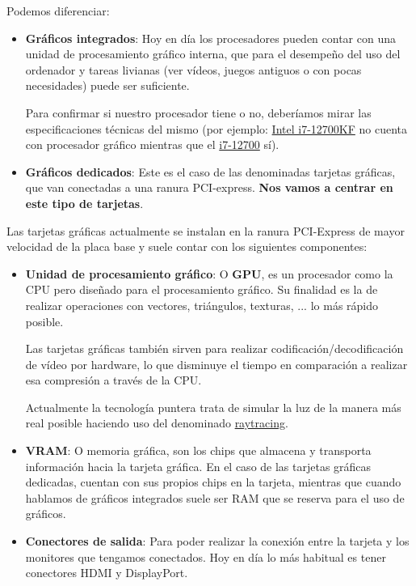 Podemos diferenciar:

\begin{itemize}
    \item \textbf{Gráficos integrados}: Hoy en día los procesadores pueden contar con una unidad de procesamiento gráfico interna, que para el desempeño del uso del ordenador y tareas livianas (ver vídeos, juegos antiguos o con pocas necesidades) puede ser suficiente.

    Para confirmar si nuestro procesador tiene o no, deberíamos mirar las especificaciones técnicas del mismo (por ejemplo: \href{https://www.intel.com/content/www/us/en/products/sku/134595/intel-core-i712700kf-processor-25m-cache-up-to-5-00-ghz/specifications.html}{Intel i7-12700KF} no cuenta con procesador gráfico mientras que el \href{https://www.intel.com/content/www/us/en/products/sku/134591/intel-core-i712700-processor-25m-cache-up-to-4-90-ghz/specifications.html}{i7-12700} sí).

    \item \textbf{Gráficos dedicados}: Este es el caso de las denominadas tarjetas gráficas, que van conectadas a una ranura PCI-express. \textbf{Nos vamos a centrar en este tipo de tarjetas}.
\end{itemize}

Las tarjetas gráficas actualmente se instalan en la ranura PCI-Express de mayor velocidad de la placa base y suele contar con los siguientes componentes:

\begin{itemize}
    \item \textbf{Unidad de procesamiento gráfico}: O \textbf{GPU}, es un procesador como la CPU pero diseñado para el procesamiento gráfico. Su finalidad es la de realizar operaciones con vectores, triángulos, texturas, ... lo más rápido posible.

    Las tarjetas gráficas también sirven para realizar codificación/decodificación de vídeo por hardware, lo que disminuye el tiempo en comparación a realizar esa compresión a través de la CPU.

    Actualmente la tecnología puntera trata de simular la luz de la manera más real posible haciendo uso del denominado \href{https://es.wikipedia.org/wiki/Trazado_de_rayos}{raytracing}.

    \item \textbf{VRAM}: O memoria gráfica, son los chips que almacena y transporta información hacia la tarjeta gráfica. En el caso de las tarjetas gráficas dedicadas, cuentan con sus propios chips en la tarjeta, mientras que cuando hablamos de gráficos integrados suele ser RAM que se reserva para el uso de gráficos.

    \item \textbf{Conectores de salida}: Para poder realizar la conexión entre la tarjeta y los monitores que tengamos conectados. Hoy en día lo más habitual es tener conectores HDMI y DisplayPort.
\end{itemize}

